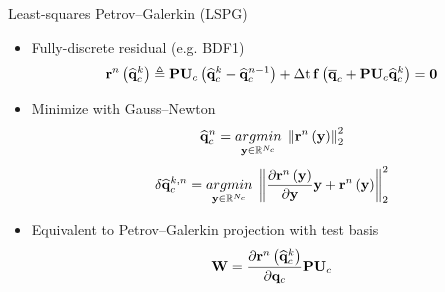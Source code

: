 \documentclass[]{beamer}
\begin{document}
\begin{frame}{Least-squares Petrov--Galerkin (LSPG)}
    \begin{itemize}
		\item Fully-discrete residual (e.g. BDF1)
		\begin{equation*}
			\resFuncIter{\timeIdx}{\consVecCoef^{\newtonIdx}} \triangleq \consScale \consTrial \left( \consVecCoef^{\newtonIdx} - \consVecCoef^{\timeIdx-1} \right) + \dt \, \rhsFunc{\consVecCent + \consScale \consTrial \consVecCoef^{\newtonIdx}} = \zeroVec
		\end{equation*}
		\item Minimize with Gauss--Newton
		\begin{equation*}
			\mathbf{\widehat{q}}_c^{n} = \underset{\mathbf{y} \in \mathbb{R}^{N_c}}{argmin} \; \left\lVert\mathbf{r}^{n}\left(\mathbf{y}\right)\right\rVert_2^2
		\end{equation*}
		\begin{equation*}
			\delta \mathbf{\widehat{q}}_c^{k, n} = \underset{\mathbf{y} \in \mathbb{R}^{N_c}}{argmin} \; \left\lVert\frac{\partial \mathbf{r}^{n}\left(\mathbf{y}\right)}{\partial \mathbf{y}} \mathbf{y} + \mathbf{r}^{n}\left(\mathbf{y}\right)\right\rVert_2^2
		\end{equation*}
		\item Equivalent to Petrov--Galerkin projection with test basis
		\begin{equation*}
			\testBasis = \pde{\resFuncIter{\timeIdx}{\consVecCoef^{\newtonIdx}}}{\consVec} \consScale \consTrial
		\end{equation*}
	\end{itemize}
\end{frame}
\end{document}
